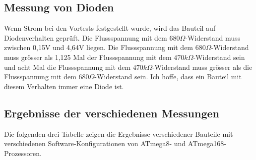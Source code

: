 \subsection{Messung von Dioden}
\label{sec:diode}
Wenn Strom bei den Vortests festgestellt wurde, wird das Bauteil auf Diodenverhalten geprüft.
Die Flussspannung mit dem \(680\Omega\)-Widerstand muss zwischen 0,15V und 4,64V liegen.
Die Flussspannung mit dem \(680\Omega\)-Widerstand muss grösser als 1,125 Mal der Flussspannung mit dem
 \(470k\Omega\)-Widerstand sein und acht Mal die Flussspannung mit dem \(470k\Omega\)-Widerstand muss
grösser als die Flussspannung mit dem \(680\Omega\)-Widerstand sein.
Ich hoffe, dass ein Bauteil mit diesem Verhalten immer eine Diode ist.

\subsection{Ergebnisse der verschiedenen Messungen}
Die folgenden drei Tabelle zeigen die Ergebnisse verschiedener Bauteile mit
verschiedenen Software-Konfigurationen von ATmega8- und ATmega168-Prozessoren.


